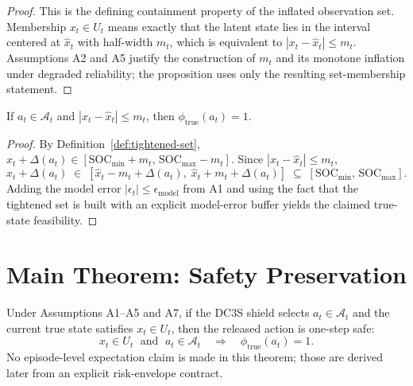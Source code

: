 \begin{proof}
This is the defining containment property of the inflated observation set.
Membership $x_t \in U_t$ means exactly that the latent state lies in the
interval centered at $\hat{x}_t$ with half-width $m_t$, which is equivalent to
$|x_t-\hat{x}_t| \le m_t$.  Assumptions A2 and A5 justify the construction of
$m_t$ and its monotone inflation under degraded reliability; the proposition
uses only the resulting set-membership statement.
\end{proof}

\begin{proposition}
\label{prop:tightened-implies-true}
If $a_t \in \mathcal{A}_t$ and $|x_t - \hat{x}_t| \le m_t$, then
$\phi_{\text{true}}(a_t) = 1$.
\end{proposition}

\begin{proof}
By Definition~\ref{def:tightened-set},
$\hat{x}_t + \Delta(a_t) \in [\text{SOC}_{\min} + m_t,\,
\text{SOC}_{\max} - m_t]$.  Since $|x_t - \hat{x}_t| \le m_t$,
\[
  x_t + \Delta(a_t) \;\in\;
  [\hat{x}_t - m_t + \Delta(a_t),\; \hat{x}_t + m_t + \Delta(a_t)]
  \;\subseteq\; [\text{SOC}_{\min},\, \text{SOC}_{\max}].
\]
Adding the model error $|\epsilon_t| \le \epsilon_{\text{model}}$ from A1 and
using the fact that the tightened set is built with an explicit model-error
buffer yields the claimed true-state feasibility.
\end{proof}

\section{Main Theorem: Safety Preservation}

\begin{theorem}
\label{thm:safety-preservation}
Under Assumptions A1--A5 and A7, if the DC3S shield selects
$a_t \in \mathcal{A}_t$ and the current true state satisfies
$x_t \in U_t$, then the released action is one-step safe:
\[
  x_t \in U_t \;\text{ and }\; a_t \in \mathcal{A}_t
  \quad\Longrightarrow\quad
  \phi_{\text{true}}(a_t) = 1.
\]
No episode-level expectation claim is made in this theorem; those are derived
later from an explicit risk-envelope contract.
\end{theorem}

